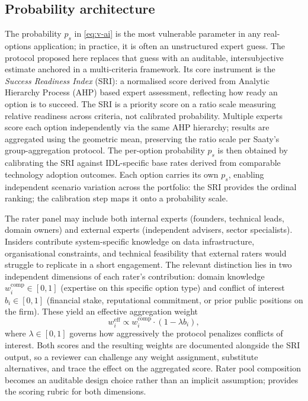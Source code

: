 \documentclass[oneside,10pt]{swissi}
\begin{document}
\subsection{Probability architecture}
\label{sec:probability}

The probability $p_s$ in \eqref{eq:v-ai} is the most vulnerable parameter in any real-options application; in practice, it is often an unstructured expert guess. The protocol proposed here replaces that guess with an auditable, intersubjective estimate anchored in a multi-criteria framework. Its core instrument is the \emph{Success Readiness Index} (SRI): a normalised score derived from Analytic Hierarchy Process (AHP) based expert assessment, reflecting how ready an option is to succeed. The SRI is a priority score on a ratio scale measuring relative readiness across criteria, not calibrated probability. Multiple experts score each option independently via the same AHP hierarchy; results are aggregated using the geometric mean, preserving the ratio scale per Saaty's group-aggregation protocol. The per-option probability $p_s$ is then obtained by calibrating the SRI against IDL-specific base rates derived from comparable technology adoption outcomes. Each option carries its own $p_s$, enabling independent scenario variation across the portfolio: the SRI provides the ordinal ranking; the calibration step maps it onto a probability scale.

The rater panel may include both internal experts (founders, technical leads, domain owners) and external experts (independent advisers, sector specialists). Insiders contribute system-specific knowledge on data infrastructure, organisational constraints, and technical feasibility that external raters would struggle to replicate in a short engagement. The relevant distinction lies in two independent dimensions of each rater's contribution: domain knowledge $w_i^{\mathrm{comp}} \in [0,1]$ (expertise on this specific option type) and conflict of interest $b_i \in [0,1]$ (financial stake, reputational commitment, or prior public positions on the firm). These yield an effective aggregation weight
\begin{equation}\label{eq:w-eff}
w_i^{\mathrm{eff}} \propto w_i^{\mathrm{comp}} \cdot (1 - \lambda b_i),
\end{equation}
where $\lambda \in [0,1]$ governs how aggressively the protocol penalizes conflicts of interest. Both scores and the resulting weights are documented alongside the SRI output, so a reviewer can challenge any weight assignment, substitute alternatives, and trace the effect on the aggregated score. Rater pool composition becomes an auditable design choice rather than an implicit assumption;  provides the scoring rubric for both dimensions.
\end{document}
